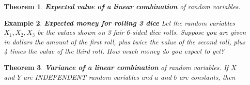 \documentclass[12pt]{amsart}
\newtheorem{theorem}{Theorem}[section]
\newtheorem{example}[theorem]{Example}
\begin{document}
{\begin{theorem}{\textbf{Expected value of a linear combination} of random variables.}
\end{theorem}



%
%
%
%



\begin{example}  \textbf{Expected money for rolling 3 dice} \newline
Let the random variables $X_1, X_2, X_3$ be the values shown on 3 fair 6-sided dice rolls. \newline 
Suppose you are given in dollars the amount of the first roll, plus twice the value of the second roll, plus 4 times the value of the third roll. \newline 
How much money do you expect to get?  \newline 



\end{example} 

\vspace{2cm}



\newpage
\begin{theorem}{\textbf{Variance of a linear combination} of random variables.} \newline
If $X$ and $Y$ are INDEPENDENT random variables and $a$ and $b$ are constants, then 
\vspace{3.5cm}



\end{theorem}}
\end{document}
